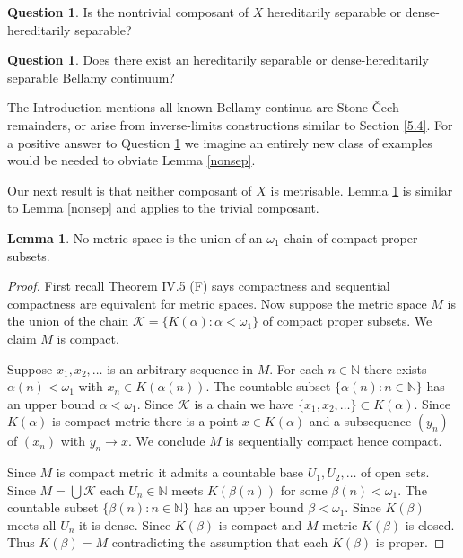 \documentclass[12pt]{article}
\theoremstyle{plain}
\theoremstyle{definition}
\newtheorem{lemma}[theorem]{Lemma}
\newcounter{qn5counter}
\newtheorem{qn5}[qn5counter]{Question}
\newcounter{claim5counter}
\newcommand{\A}{\ensuremath{\alpha}}
\newcommand{\B}{\ensuremath{\beta}}
\newcommand{\W}{\ensuremath{\omega}}
\newcommand{\NN}{\ensuremath{\mathbb N}}
\newcommand{\0}{\ensuremath{\varnothing}}
\newcommand{\cK}{\ensuremath{\mathcal K}}
\begin{document}
	\begin{qn5}
		Is the nontrivial composant of $X$ hereditarily separable or dense-hereditarily separable? 
	\end{qn5}
	
	\begin{qn5}\label{q2}
		Does there exist an hereditarily separable or dense-hereditarily separable Bellamy continuum? 
	\end{qn5}
	
	The Introduction mentions all known Bellamy continua are Stone-\v Cech remainders, 
	or arise from inverse-limits constructions similar to Section \ref{5.4}.
	For a positive answer to Question \ref{q2} we imagine an entirely new class of examples 
	would be needed to obviate Lemma \ref{nonsep}.
	
	Our next result is that neither composant of $X$ is metrisable.
	Lemma \ref{nonmet} is similar to Lemma \ref{nonsep} and applies to the trivial composant.
	
	\begin{lemma}\label{nonmet}
		No metric space is the union of an $\W_1$-chain of compact proper subsets.
	\end{lemma}
	
	\begin{proof}
		First recall \cite{nagata} Theorem IV.5 (F) says compactness and sequential compactness are equivalent for metric spaces.
		Now suppose the metric space $M$ is the union of the chain $\cK = \{K(\A): \A < \W_1 \}$ of compact proper subsets.
		We claim $M$ is compact.
		
		Suppose $x_1,x_2,\ldots$ is an arbitrary sequence in $M$.
		For each $n \in \NN$ there exists $\A(n) < \W_1$ with $x_n \in K(\A(n))$.
		The countable subset $\{\A(n): n \in \NN\}$ has an upper bound $\A < \W_1$.
		Since $\cK$ is a chain we have $\{x_1,x_2,\ldots\} \subset K(\A)$.
		Since $K(\A)$ is compact metric there is a point $x \in K(\A)$ 
		and a subsequence $(y_n)$ of $(x_n)$ with $y_n \to x$.
		We conclude $M$ is sequentially compact hence compact.
		
		Since $M$ is compact metric it admits a countable base $U_1,U_2,\ldots$ of open sets.
		Since $M = \bigcup \cK$ each $U_n \in \NN$ meets $K(\B(n))$ for some $\B(n)< \W_1$. 
		The countable subset $\{\B(n): n \in \NN\}$ has an upper bound $\B < \W_1$.
		Since $K(\B)$ meets all $U_n$ it is dense.
		Since $K(\B)$ is compact and $M$ metric $K(\B)$ is closed.
		Thus $K(\B)=M$ contradicting the assumption that each $K(\B)$ is proper.
	\end{proof}
	
\end{document}
